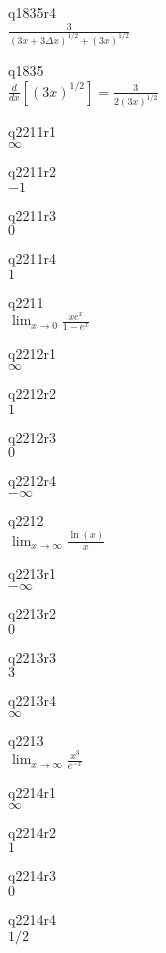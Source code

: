 q1835r4\\
\(\displaystyle \frac{3}{(3x + 3\Delta x)^{1/2} + (3x)^{1/2}} \)

q1835\\
\(\displaystyle \frac{d}{dx} [ (3x)^{1/2}] = \frac{3}{2(3x)^{1/2}} \)

q2211r1\\
\(\displaystyle \infty \)

q2211r2\\
\(\displaystyle -1 \)

q2211r3\\
\(\displaystyle 0 \)

q2211r4\\
\(\displaystyle 1 \)

q2211\\
\(\displaystyle \lim_{x \rightarrow 0} \frac{xe^x}{1-e^x} \)

q2212r1\\
\(\displaystyle \infty \)

q2212r2\\
\(\displaystyle 1 \)

q2212r3\\
\(\displaystyle 0 \)

q2212r4\\
\(\displaystyle -\infty \)

q2212\\
\(\displaystyle \lim_{x \rightarrow \infty} \frac{\ln(x)}{x} \)

q2213r1\\
\(\displaystyle -\infty \)

q2213r2\\
\(\displaystyle 0 \)

q2213r3\\
\(\displaystyle 3 \)

q2213r4\\
\(\displaystyle \infty \)

q2213\\
\(\displaystyle \lim_{x \rightarrow \infty} \frac{x^3}{e^{-x}} \)

q2214r1\\
\(\displaystyle \infty \)

q2214r2\\
\(\displaystyle 1 \)

q2214r3\\
\(\displaystyle 0 \)

q2214r4\\
\(\displaystyle 1/2 \)

